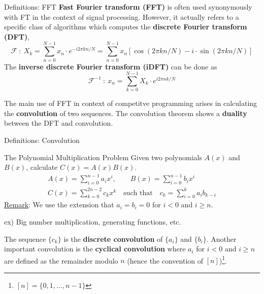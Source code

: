 \documentclass[10pt,table]{beamer}
\begin{document}
\begin{frame}{Definitions: FFT}
\textbf{Fast Fourier transform (FFT)} is often used synonymously with FT in the context of signal processing. However, it actually refers to a specific class of algorithms which computes the \textbf{discrete Fourier transform (DFT)},
\begin{equation*}
\mathcal{F}\::\:X_k=\sum_{n=0}^{N-1}x_n\cdot e^{-i2\pi kn/N}=\sum_{n=0}^{N-1}x_n\left[\cos(2\pi kn/N)-i\cdot\sin(2\pi kn/N)\right]
\end{equation*}
The \textbf{inverse discrete Fourier transform (iDFT)} can be done as
\begin{equation*}
\mathcal{F}^{-1}\::\:x_n=\sum_{k=0}^{N-1}X_k\cdot e^{i2\pi nk/N}
\end{equation*}

\vfill

The main use of FFT in context of competitve programming arises in calculating the \textbf{convolution} of two sequences. The convolution theorem shows a \textbf{duality} between the DFT and convolution.
\end{frame}

\begin{frame}{Definitions: Convolution}
\begin{block}{The Polynomial Multiplication Problem}
Given two polynomials $A(x)$ and $B(x)$, calculate $C(x)=A(x)B(x)$.
\begin{gather*}
A(x)=\sum_{i=0}^{n-1}a_ix^i,\qquad B(x)=\sum_{i=0}^{n-1}b_ix^i\\
C(x)=\sum_{k=0}^{2n-2}c_kx^k\quad\text{such that}\quad c_k=\sum_{i=0}^{k}a_ib_{k-i}
\end{gather*}
\underline{Remark}: We use the extension that $a_i=b_i=0$ for $i<0$ and $i\geq n$.
\end{block}
ex) Big number multiplication, generating functions, etc.

The sequence $\{c_k\}$ is the \textbf{discrete convolution} of $\{a_i\}$ and $\{b_i\}$. Another important convolution is the \textbf{cyclical convolution} where $a_i$ for $i<0$ and $i\geq n$ are defined as the remainder modulo $n$ (hence the convention of $[n]$)\footnote{$[n]=\{0,1,...,n-1\}$}.
\end{frame}
\end{document}
